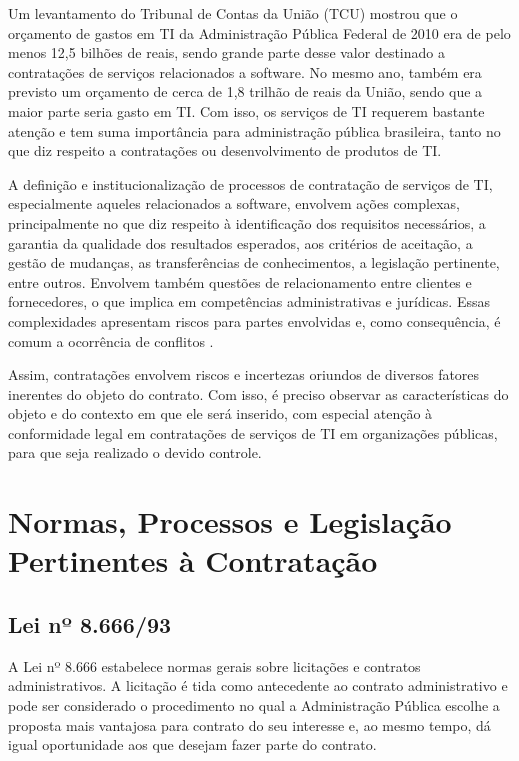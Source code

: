 Um levantamento do Tribunal de Contas da União (TCU) mostrou que o orçamento de gastos em TI da Administração Pública Federal de 2010 era de pelo menos 12,5 bilhões de reais, sendo grande parte desse valor destinado a contratações de serviços relacionados a software. No mesmo ano, também era previsto um orçamento de cerca de 1,8 trilhão de reais da União, sendo que a maior parte seria gasto em TI. Com isso, os serviços de TI requerem bastante atenção e tem suma importância para administração pública brasileira, tanto no que diz respeito a contratações ou desenvolvimento de produtos de TI.

A definição e institucionalização de processos de contratação de serviços de TI, especialmente aqueles relacionados a software, envolvem ações complexas, principalmente no que diz respeito à identificação dos requisitos necessários, a garantia da qualidade dos resultados esperados, aos critérios de aceitação, a gestão de mudanças, as transferências de conhecimentos, a legislação pertinente, entre outros. Envolvem também questões de relacionamento entre clientes e fornecedores, o que implica em competências administrativas e jurídicas. Essas complexidades apresentam riscos para partes envolvidas e, como consequência, é comum a ocorrência de conflitos \cite{cruz2011}.

Assim, contratações envolvem riscos e incertezas oriundos de diversos fatores inerentes do objeto do contrato. Com isso, é preciso observar as características do objeto e do contexto em que ele será inserido, com especial atenção à conformidade legal em contratações de serviços de TI em organizações públicas, para que seja realizado o devido controle.


\section[Normas, Processos e Legislação Pertinentes à Contratação]{Normas, Processos e Legislação Pertinentes à Contratação}

\subsection[Lei nº 8.666/93]{Lei nº 8.666/93}

A Lei nº 8.666 \cite{Lei8666:1993} estabelece normas gerais sobre licitações e contratos administrativos. A licitação é tida como antecedente ao contrato administrativo e pode ser considerado o procedimento no qual a Administração Pública escolhe a proposta mais vantajosa para contrato do seu interesse e, ao mesmo tempo, dá igual oportunidade aos que desejam fazer parte do contrato.

